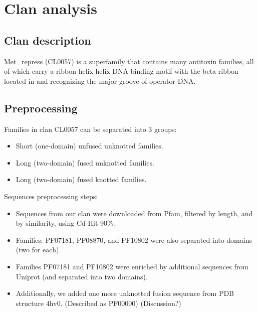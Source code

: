 \section{Clan analysis}
\subsection{Clan description}
Met\_repress (CL0057) is a superfamily that contains many antitoxin families, all of which carry a ribbon-helix-helix DNA-binding motif with the beta-ribbon located in and recognizing the major groove of operator DNA\@.

		\subsection{Preprocessing}
Families in clan CL0057 can be separated into 3 groups:
\begin{itemize}
   \item Short (one-domain) unfused unknotted families.
   \item Long (two-domain) fused unknotted families.
   \item Long (two-domain) fused knotted families.
\end{itemize}

Sequences preprocessing steps:
\begin{itemize}
\item Sequences from our clan were downloaded from Pfam, filtered by length, and by similarity, using Cd-Hit 90\%.
\item Families: PF07181, PF08870, and PF10802 were also separated into domains (two for each).
\item Families PF07181 and PF10802 were enriched by additional sequences from Uniprot (and separated into two domains).
\item Additionally, we added one more unknotted fusion sequence from PDB structure 4hv0. (Described as PF00000) (Discussion?)
\end{itemize}

